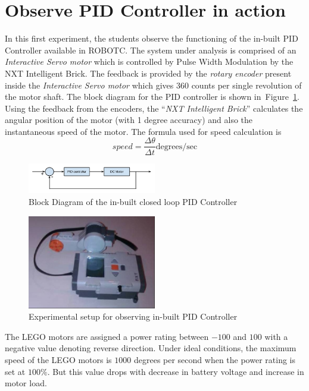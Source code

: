 \documentclass[a4paper,10pt]{article}
\begin{document}
\section{Observe PID Controller in action}
In this first experiment, the students observe the functioning of the in-built PID Controller available in ROBOTC. The system under analysis is comprised of an \emph{Interactive Servo motor} which is controlled by Pulse Width Modulation by the NXT Intelligent Brick. The feedback is provided by the \emph{rotary encoder} present inside the \emph{Interactive Servo motor} which gives 360 counts per single revolution of the motor shaft. The block diagram for the PID controller is shown in~Figure~\ref{fig:block_diagram}. Using the feedback from the encoders, the ``\emph{NXT Intelligent Brick}'' calculates the angular position of the motor (with 1 degree accuracy) and also the instantaneous speed of the motor. The formula used for speed calculation is
\begin{equation}
speed = \frac{\Delta\theta}{\Delta{}t} \text{degrees/sec}
\end{equation}
\begin{figure}[!hbp]
	\includegraphics[width=0.5\textwidth]{block_diagram}
	\caption{Block Diagram of the in-built closed loop PID Controller}
	\label{fig:block_diagram}
\end{figure}

\begin{figure}[!hbp]
	\includegraphics[width=0.5\textwidth]{setup}
	\caption{Experimental setup for observing in-built PID Controller}
	\label{fig:setup}
\end{figure}

The LEGO motors are assigned a power rating between $-100$ and $100$ with a negative value denoting reverse direction. Under ideal conditions, the maximum speed of the LEGO motors is $1000$ degrees per second when the power rating is set at $100\%$. But this value drops with decrease in battery voltage and increase in motor load. 
\end{document}

